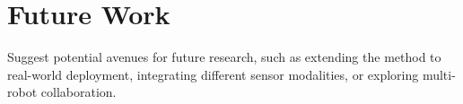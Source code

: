 \section{Future Work}

\begin{outline}
  Suggest potential avenues for future research, such as extending
  the method to real-world deployment, integrating different sensor
  modalities, or exploring multi-robot collaboration.
\end{outline}

